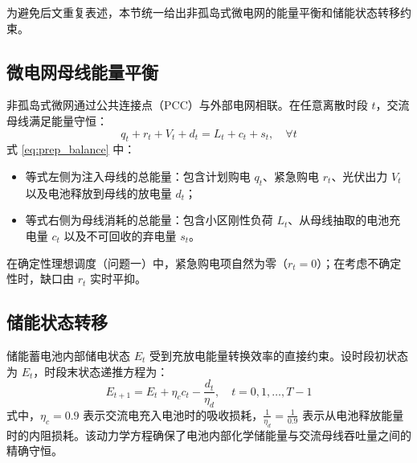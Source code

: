 \documentclass[withoutpreface]{cumcmthesis}
\begin{document}
为避免后文重复表述，本节统一给出非孤岛式微电网的能量平衡和储能状态转移约束。

\subsection{微电网母线能量平衡}
非孤岛式微网通过公共连接点（PCC）与外部电网相联。在任意离散时段 $t$，交流母线满足能量守恒：
\begin{equation}
    q_t + r_t + V_t + d_t = L_t + c_t + s_t, \quad \forall t \label{eq:prep_balance}
\end{equation}
式 \eqref{eq:prep_balance} 中：
\begin{itemize}
    \item 等式左侧为注入母线的总能量：包含计划购电 $q_t$、紧急购电 $r_t$、光伏出力 $V_t$ 以及电池释放到母线的放电量 $d_t$；
    \item 等式右侧为母线消耗的总能量：包含小区刚性负荷 $L_t$、从母线抽取的电池充电量 $c_t$ 以及不可回收的弃电量 $s_t$。
\end{itemize}
在确定性理想调度（问题一）中，紧急购电项自然为零（$r_t = 0$）；在考虑不确定性时，缺口由 $r_t$ 实时平抑。

\subsection{储能状态转移}
储能蓄电池内部储电状态 $E_t$ 受到充放电能量转换效率的直接约束。设时段初状态为 $E_t$，时段末状态递推方程为：
\begin{equation}
    E_{t+1} = E_t + \eta_c c_t - \frac{d_t}{\eta_d}, \quad t = 0, 1, \dots, T-1 \label{eq:prep_soc}
\end{equation}
式中，$\eta_c = 0.9$ 表示交流电充入电池时的吸收损耗，$\frac{1}{\eta_d} = \frac{1}{0.9}$ 表示从电池释放能量时的内阻损耗。该动力学方程确保了电池内部化学储能量与交流母线吞吐量之间的精确守恒。
\end{document}
